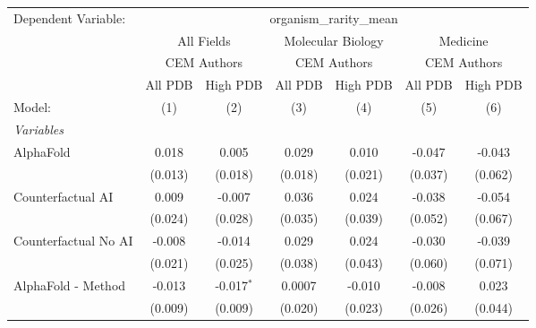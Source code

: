\begingroup
\centering
\begin{tabular}{lcccccc}
   \tabularnewline \midrule \midrule
   Dependent Variable: & \multicolumn{6}{c}{organism\_rarity\_mean}\\
 & \multicolumn{2}{c}{All Fields} & \multicolumn{2}{c}{Molecular Biology} & \multicolumn{2}{c}{Medicine} \\
\cmidrule(lr){2-3} \cmidrule(lr){4-5} \cmidrule(lr){6-7}
 & \multicolumn{2}{c}{CEM Authors} & \multicolumn{2}{c}{CEM Authors} & \multicolumn{2}{c}{CEM Authors} \\
\cmidrule(lr){2-3} \cmidrule(lr){4-5} \cmidrule(lr){6-7}
 & \multicolumn{1}{c}{All PDB} & \multicolumn{1}{c}{High PDB} & \multicolumn{1}{c}{All PDB} & \multicolumn{1}{c}{High PDB} & \multicolumn{1}{c}{All PDB} & \multicolumn{1}{c}{High PDB} \\
\cmidrule(lr){2-2} \cmidrule(lr){3-3} \cmidrule(lr){4-4} \cmidrule(lr){5-5} \cmidrule(lr){6-6} \cmidrule(lr){7-7}
   Model:                                                     & (1)         & (2)          & (3)           & (4)          & (5)         & (6)\\  
   \midrule
   \emph{Variables}\\
   AlphaFold                                                  & 0.018       & 0.005        & 0.029         & 0.010        & -0.047      & -0.043\\   
                                                              & (0.013)     & (0.018)      & (0.018)       & (0.021)      & (0.037)     & (0.062)\\   
   Counterfactual AI                                          & 0.009       & -0.007       & 0.036         & 0.024        & -0.038      & -0.054\\   
                                                              & (0.024)     & (0.028)      & (0.035)       & (0.039)      & (0.052)     & (0.067)\\   
   Counterfactual No AI                                       & -0.008      & -0.014       & 0.029         & 0.024        & -0.030      & -0.039\\   
                                                              & (0.021)     & (0.025)      & (0.038)       & (0.043)      & (0.060)     & (0.071)\\   
   AlphaFold - Method                                         & -0.013      & -0.017$^{*}$ & 0.0007        & -0.010       & -0.008      & 0.023\\   
                                                              & (0.009)     & (0.009)      & (0.020)       & (0.023)      & (0.026)     & (0.044)\\   

\end{tabular}

